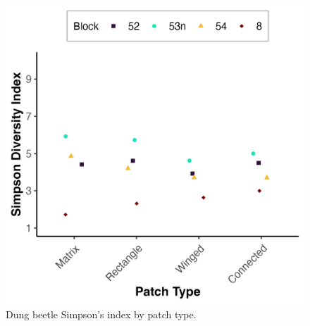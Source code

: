 \documentclass[
  man, donotrepeattitle]{apa6}
\begin{document}
\newpage

\begin{figure}[H]

{\centering \includegraphics[width=0.7\linewidth,]{images/sp_simpson_patches} 

}

\caption{Dung beetle Simpson's index by patch type.}\label{fig:simpson}
\end{figure}

\newpage

\begin{center}
\end{center}
\end{document}

